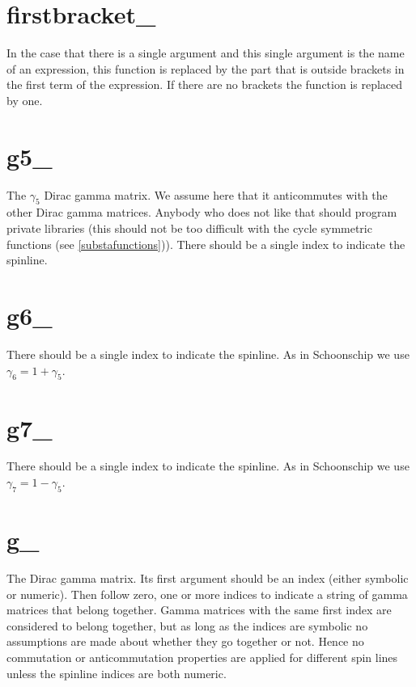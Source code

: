\section{firstbracket\_}
\label{funfirstbracket}
\noindent In the case that there is a single argument and this 
single argument is the name of an expression, this function is replaced by 
the part that is outside brackets in the first term of the expression. If 
there are no brackets the function is replaced by one.

\section{g5\_}
\label{fungfive}
\noindent The $\gamma_5$ Dirac gamma matrix. We assume here that it 
anticommutes with the other Dirac gamma 
matrices. Anybody who does not like that should program private libraries 
(this should not be too difficult with the cycle symmetric functions 
(see \ref{substafunctions})). There should be a single index to indicate 
the spinline.

\section{g6\_}
\label{fungsix}
\noindent There should be a single index to indicate the spinline. 
As in Schoonschip we use $\gamma_6 = 1+\gamma_5$.

\section{g7\_}
\label{fungseven}
\noindent There should be a single index to indicate the spinline. 
As in Schoonschip we use $\gamma_7 = 1-\gamma_5$.

\section{g\_}
\label{fung}
\noindent The Dirac gamma matrix. Its 
first argument should be an index (either symbolic or numeric). Then follow 
zero, one or more indices to indicate a string of gamma matrices that 
belong together. Gamma matrices with the same first index are considered to 
belong together, but as long as the indices are symbolic no assumptions are 
made about whether they go together or not. Hence no commutation or 
anticommutation properties are applied for different spin lines unless the 
spinline indices are both numeric.

